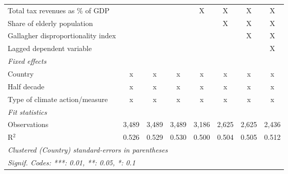 \begin{table}[htbp]
\begin{tabular}{lccccccc}
      Total tax revenues as \% of GDP                                    &                &               &                & X             & X             & X             & X\\  
      Share of elderly population                                        &                &               &                &               & X             & X             & X\\  
      Gallagher disproportionality index                                 &                &               &                &               &               & X             & X\\  
      Lagged dependent variable                                          &                &               &                &               &               &               & X\\  
      \emph{Fixed effects}\\
      Country                                                            & x              & x             & x              & x             & x             & x             & x\\  
      Half decade                                                        & x              & x             & x              & x             & x             & x             & x\\  
      Type of climate action/measure                                     & x              & x             & x              & x             & x             & x             & x\\  
      \midrule \emph{Fit statistics}\\
      Observations                                                       & 3,489          & 3,489         & 3,489          & 3,186         & 2,625         & 2,625         & 2,436\\  
      R$^2$                                                              & 0.526          & 0.529         & 0.530          & 0.500         & 0.504         & 0.505         & 0.512\\  
      \midrule
      \multicolumn{8}{l}{\emph{Clustered (Country) standard-errors in parentheses}}\\
      \multicolumn{8}{l}{\emph{Signif. Codes: ***: 0.01, **: 0.05, *: 0.1}}\\
   \end{tabular}
\end{table}


